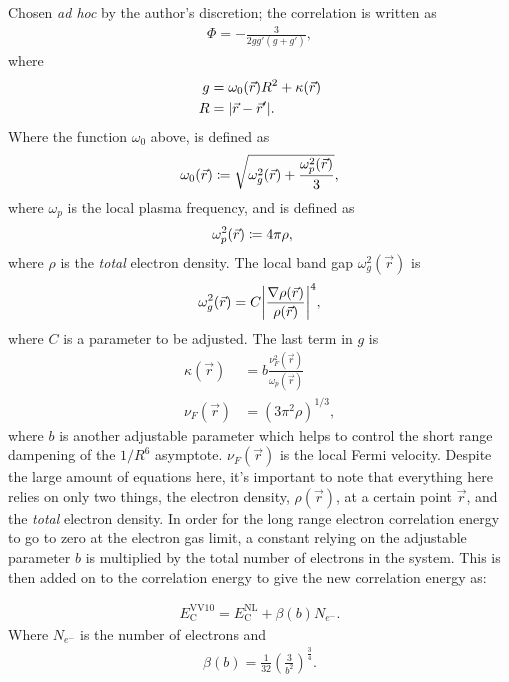 \documentclass[10pt,a4paper,twocolumn,twoside]{extarticle}
\begin{document}
	Chosen \textit{ad hoc} by the author's discretion; the correlation is written as
	\begin{align}
		\Phi = - \frac{3}{2gg'(g+g')},
	\end{align}
	where 
	\begin{align}
		g &= \omega_0(\vec{r})R^2 + \kappa(\vec{r})\\
		R &= \absolutevalue{\vec{r} - \vec{r}'}.
	\end{align}
	Where the function $\omega_0$ above, is defined as
	\begin{align}
		\omega_0(\vec{r}) \coloneqq \sqrt{ \omega_g^2(\vec{r}) + \frac{\omega_p^2(\vec{r})}{3}},
	\end{align}
	where $\omega_p$ is the local plasma frequency, and is defined as 
	\begin{align}
		\omega_p^2(\vec{r}) &\coloneqq 4\pi \rho,
	\end{align}
	where $\rho$ is the \emph{total} electron density. The local band gap $\omega_g^2(\vec{r})$ is 
	\begin{align}
		\omega_g^2(\vec{r}) = C \absolutevalue{\frac{\nabla \rho(\vec{r})}{\rho(\vec{r})}}^4,
	\end{align}
	where $C$ is a parameter to be adjusted. The last term in $g$ is
	\begin{align}
		\kappa(\vec{r}) &= b \frac{\nu_F^2(\vec{r})}{\omega_p(\vec{r})} \\
		\nu_F(\vec{r}) &= (3 \pi^2 \rho)^{1/3},
	\end{align}
	where $b$ is another adjustable parameter which helps to control the short range dampening of the $1/R^6$ asymptote. $\nu_F(\vec{r})$ is the local Fermi velocity. 
	Despite the large amount of equations here, it's important to note that everything here relies on only two things, the electron density, $\rho(\vec{r})$, at a certain point $\vec{r}$, and the \emph{total} electron density. 
	In order for the long range electron correlation energy to go to zero at the electron gas limit, a constant relying on the adjustable parameter $b$ is multiplied by the total number of electrons in the system. This is then added on to the correlation energy to give the new correlation energy as:

	\begin{align}
		E_\text{C}^\text{VV10} = E_\text{C}^\text{NL} + \beta (b)N_{e^-}.
	\end{align}
	Where $N_{e^-}$ is the number of electrons and 
	\begin{align}
		\beta(b) = \frac{1}{32} \left(\frac{3}{b^2}\right)^{\frac{3}{4}}.
	\end{align}
\end{document}
